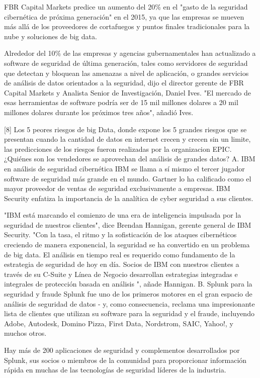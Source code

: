 \documentclass[journal]{IEEEtran}
\begin{document}
FBR Capital Markets predice un aumento del 20\% en el "gasto de la seguridad cibernética de próxima generación" en el 2015, ya que las empresas se mueven más allá de los proveedores de cortafuegos y puntos finales tradicionales para la nube y soluciones de big data.

Alrededor del 10\% de las empresas y agencias gubernamentales han actualizado a software de seguridad de última generación, tales como servidores de seguridad que detectan y bloquean las amenazas a nivel de aplicación, o grandes servicios de análisis de datos orientados a la seguridad, dijo el director gerente de FBR Capital Markets y Analista Senior de Investigación, Daniel Ives. "El mercado de esas herramientas de software podría ser de 15 mil millones dolares a 20 mil millones dolares durante los próximos tres años", añadió Ives.

[8] Los 5 peores riesgos de big Data, donde expone los 5 grandes riesgos que se presentan cuando la cantidad de datos en internet crecen y crecen sin un limite, las predicciones de los riesgos fueron realizadas por la organizacion EPIC.
¿Quiénes son los vendedores se aprovechan del análisis de grandes datos?
A. IBM en análisis de seguridad cibernética
IBM se llama a sí mismo el tercer jugador software de seguridad más grande en el mundo. Gartner lo ha calificado como el mayor proveedor de ventas de seguridad exclusivamente a empresas. IBM Security enfatiza la importancia de la analítica de cyber seguridad a sus clientes.

"IBM está marcando el comienzo de una era de inteligencia impulsada por la seguridad de nuestros clientes", dice Brendan Hannigan, gerente general de IBM Security. "Con la tasa, el ritmo y la sofisticación de los ataques cibernéticos creciendo de manera exponencial, la seguridad se ha convertido en un problema de big data. El análisis en tiempo real es requerido como fundamento de la estrategia de seguridad de hoy en día. Socios de IBM con nuestros clientes a través de su C-Suite y Línea de Negocio desarrollan estrategias integradas e integrales de protección basada en análisis ", añade Hannigan.
B. Splunk para la seguridad y fraude
Splunk fue uno de los primeros motores en el gran espacio de análisis de seguridad de datos - y, como consecuencia, reclama una impresionante lista de clientes que utilizan su software para la seguridad y el fraude, incluyendo Adobe, Autodesk, Domino Pizza, First Data, Nordstrom, SAIC, Yahoo!, y muchos otros.

Hay más de 200 aplicaciones de seguridad y complementos desarrollados por Splunk, sus socios o miembros de la comunidad para proporcionar información rápida en muchas de las tecnologías de seguridad líderes de la industria.
\end{document}
